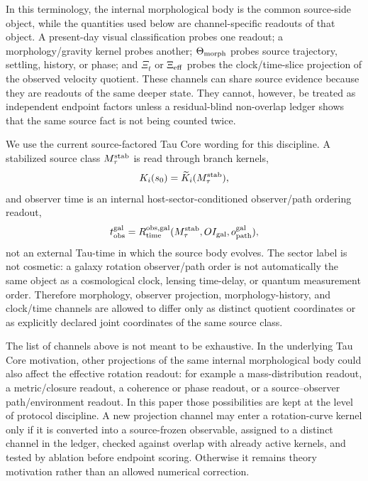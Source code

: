 \documentclass[11pt]{article}
\begin{document}
In this terminology, the internal morphological body is the common
source-side object, while the quantities used below are channel-specific
readouts of that object.  A present-day visual classification probes one
readout; a morphology/gravity kernel probes another; \(\Theta_{\rm morph}\)
probes source trajectory, settling, history, or phase; and \(\Xi_t\) or
\(\Xi_{\rm eff}\) probes the clock/time-slice projection of the observed
velocity quotient.  These channels can share source evidence because they are
readouts of the same deeper state.  They cannot, however, be treated as
independent endpoint factors unless a residual-blind non-overlap ledger shows
that the same source fact is not being counted twice.

We use the current source-factored Tau Core wording for this discipline.  A
stabilized source class \(M_\tau^{\rm stab}\) is read through branch kernels,
\[
K_i(s_0)=\widetilde K_i(M_\tau^{\rm stab}),
\]
and observer time is an internal host-sector-conditioned observer/path ordering
readout,
\[
t_{\rm obs}^{\rm gal}
=R_{\rm time}^{\rm obs,gal}
(M_\tau^{\rm stab},OI_{\rm gal},o_{\rm path}^{\rm gal}),
\]
not an external Tau-time in which the source body evolves.  The sector label is
not cosmetic: a galaxy rotation observer/path order is not automatically the
same object as a cosmological clock, lensing time-delay, or quantum measurement
order.  Therefore
morphology, observer projection, morphology-history, and clock/time channels
are allowed to differ only as distinct quotient coordinates or as explicitly
declared joint coordinates of the same source class.

The list of channels above is not meant to be exhaustive.  In the underlying
Tau Core motivation, other projections of the same internal morphological body
could also affect the effective rotation readout: for example a
mass-distribution readout, a metric/closure readout, a coherence or phase
readout, or a source--observer path/environment readout.  In this paper those
possibilities are kept at the level of protocol discipline.  A new projection
channel may enter a rotation-curve kernel only if it is converted into a
source-frozen observable, assigned to a distinct channel in the ledger, checked
against overlap with already active kernels, and tested by ablation before
endpoint scoring.  Otherwise it remains theory motivation rather than an
allowed numerical correction.
\end{document}

